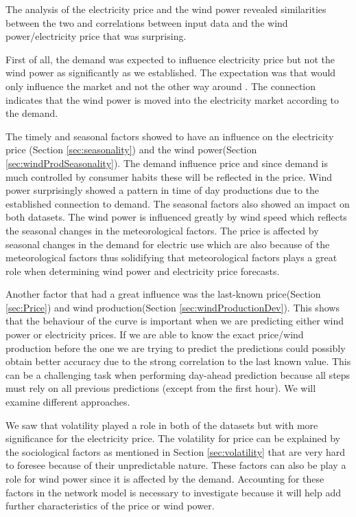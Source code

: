 The analysis of the electricity price and the wind power revealed similarities between the two and correlations between input data and the wind power/electricity price that was surprising.

First of all, the demand was expected to influence electricity price but not the wind power as significantly as we established. The expectation was that  would only influence the market and not the other way around . The connection indicates that the wind power is moved into the electricity market according to the demand.

The timely and seasonal factors showed to have an influence on the electricity price (Section \ref{sec:seasonality}) and the wind power(Section \ref{sec:windProdSeasonality}). The demand influence price and since demand is much controlled by consumer habits these will be reflected in the price. Wind power surprisingly showed a pattern in time of day productions due to the established connection to demand. The seasonal factors also showed an impact on both datasets. The wind power is influenced greatly by wind speed which reflects the seasonal changes in the meteorological factors. The price is affected by seasonal changes in the demand for electric use which are also because of the meteorological factors thus solidifying that meteorological factors plays a great role when determining wind power and electricity price forecasts.

Another factor that had a great influence was the last-known price(Section \ref{sec:Price}) and wind production(Section \ref{sec:windProductionDev}). This shows that the behaviour of the curve is important when we are predicting either wind power or electricity prices. If we are able to know the exact price/wind production before the one we are trying to predict the predictions could possibly obtain better accuracy due to the strong correlation to the last known value. This can be a challenging task when performing day-ahead prediction because all steps must rely on all previous predictions (except from the first hour). We will examine different approaches. 

We saw that volatility played a role in both of the datasets but with more significance for the electricity price. The volatility for price can be explained by the sociological factors as mentioned in Section \ref{sec:volatility} that are very hard to foresee because of their unpredictable nature. These factors can also be play a role for wind power since it is affected by the demand. Accounting for these factors in the network model is necessary to investigate because it will help add further characteristics of the price or wind power.


